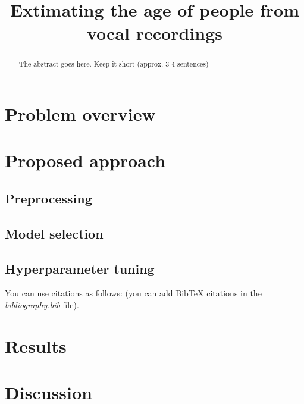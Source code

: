 \documentclass[conference]{IEEEtran}
\begin{document}
\title{Extimating the age of people from vocal recordings}

\author{
\and
{}
}

\maketitle

\begin{abstract}
The abstract goes here. Keep it short (approx. 3-4 sentences)
\end{abstract}

\section{Problem overview}


\section{Proposed approach}
\subsection{Preprocessing}

\subsection{Model selection}

\subsection{Hyperparameter tuning}


You can use citations as follows: \cite{goodfellow2016deep} (you can add BibTeX citations in the \textit{bibliography.bib} file).


\section{Results}


\section{Discussion}





\end{document}
